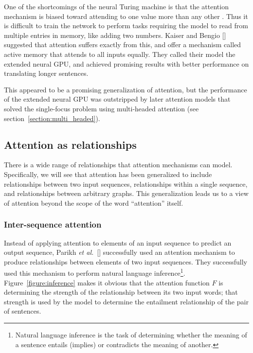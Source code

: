 \documentclass{article}
\newcommand{\etal}{\textit{et al.}}
\begin{document}
One of the shortcomings of the neural Turing machine is that the attention mechanism is biased toward attending to one value more than any other \cite{active_memory}. Thus it is difficult to train the network to perform tasks requiring the model to read from multiple entries in memory, like adding two numbers. Kaiser and Bengio [\citeyear{active_memory}] suggested that attention suffers exactly from this, and offer a mechanism called active memory that attends to all inputs equally. They called their model the extended neural GPU, and achieved promising results with better performance on translating longer sentences.

This appeared to be a promising generalization of attention, but the performance of the extended neural GPU was outstripped by later attention models that solved the single-focus problem using multi-headed attention \cite{attn_all_you_need} (see section~\ref{section:multi_headed}).

\subsection{Attention as relationships}

There is a wide range of relationships that attention mechanisms can model. Specifically, we will see that attention has been generalized to include relationships between two input sequences, relationships within a single sequence, and relationships between arbitrary graphs. This generalization leads us to a view of attention beyond the scope of the word ``attention'' itself.

\subsubsection{Inter-sequence attention}

Instead of applying attention to elements of an input sequence to predict an output sequence, Parikh \etal~[\citeyear{natural_language_inference}] successfully used an attention mechanism to produce relationships between elements of two input sequences. They successfully used this mechanism to perform natural language inference\footnote{Natural language inference is the task of determining whether the meaning of a sentence entails (implies) or contradicts the meaning of another.}. Figure~\ref{figure:inference} makes it obvious that the attention function $F$ is determining the strength of the relationship between its two input words; that strength is used by the model to determine the entailment relationship of the pair of sentences.
\end{document}
